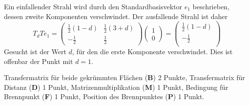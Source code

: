 \begin{loesung}
Ein einfallender Strahl wird durch den Standardbasisvektor $e_1$ beschrieben,
dessen zweite Komponenten verschwindet.
Der ausfallende Strahl ist daher 
\[
T_dTe_1
=
\begin{pmatrix}
\frac12(1-d) & \frac12(3+d) \\
-\frac12 & \frac12
\end{pmatrix}
\begin{pmatrix}1\\0\end{pmatrix}
=
\begin{pmatrix}
\frac12(1-d) \\
-\frac12 \\
\end{pmatrix}
\]
Gesucht ist der Wert $d$, für den die erste Komponente verschwindet.
Dies ist offenbar der Punkt mit $d=1$.
\end{loesung}

\begin{bewertung}
Transfermatrix für beide gekrümmten Flächen ({\bf B}) 2 Punkte,
Transfermatrix für Distanz ({\bf D}) 1 Punkt,
Matrizenmultiplikation ({\bf M}) 1 Punkt,
Bedingung für Brennpunkt ({\bf F}) 1 Punkt,
Position des Brennpunktes ({\bf P}) 1 Punkt.
\end{bewertung}



